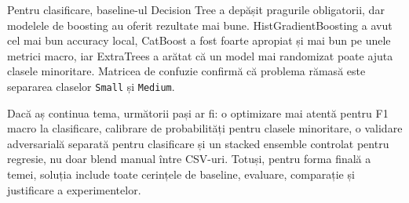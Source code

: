 \documentclass[12pt,a4paper]{article}
\begin{document}
Pentru clasificare, baseline-ul Decision Tree a depășit pragurile obligatorii, dar modelele de boosting au oferit rezultate mai bune. HistGradientBoosting a avut cel mai bun accuracy local, CatBoost a fost foarte apropiat și mai bun pe unele metrici macro, iar ExtraTrees a arătat că un model mai randomizat poate ajuta clasele minoritare. Matricea de confuzie confirmă că problema rămasă este separarea claselor \texttt{Small} și \texttt{Medium}.

Dacă aș continua tema, următorii pași ar fi: o optimizare mai atentă pentru F1 macro la clasificare, calibrare de probabilități pentru clasele minoritare, o validare adversarială separată pentru clasificare și un stacked ensemble controlat pentru regresie, nu doar blend manual între CSV-uri. Totuși, pentru forma finală a temei, soluția include toate cerințele de baseline, evaluare, comparație și justificare a experimentelor.
\end{document}
